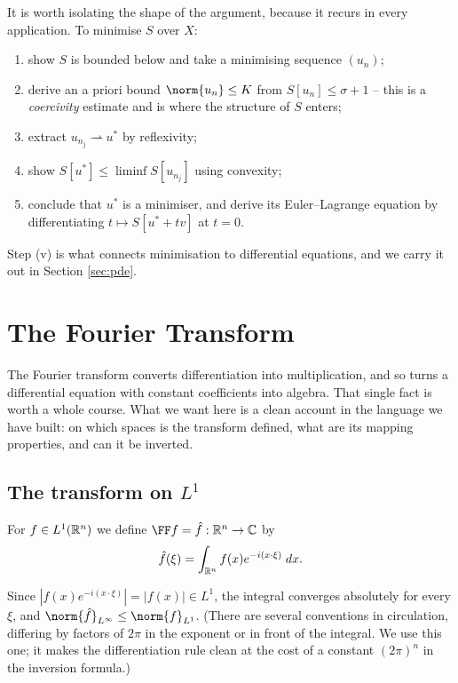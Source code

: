 \documentclass[a4paper]{scrartcl}
\newcommand{\weakto}{\rightharpoonup}
\begin{document}
\begin{remark}
	It is worth isolating the shape of the argument, because it recurs in every application. To minimise $S$ over $X$:
	\begin{enumerate}[label=(\roman*)]
		\item show $S$ is bounded below and take a minimising sequence $(u_n)$;
		\item derive an a priori bound $\norm{u_n}\le K$ from $S[u_n]\le \sigma + 1$ -- this is a \emph{coercivity} estimate and is where the structure of $S$ enters;
		\item extract $u_{n_j}\weakto u^*$ by reflexivity;
		\item show $S[u^*]\le\liminf S[u_{n_j}]$ using convexity;
		\item conclude that $u^*$ is a minimiser, and derive its Euler--Lagrange equation by differentiating $t \mapsto S[u^*+tv]$ at $t=0$.
	\end{enumerate}
	Step (v) is what connects minimisation to differential equations, and we carry it out in Section \ref{sec:pde}.
\end{remark}

\section{The Fourier Transform}\label{sec:fourier}

The Fourier transform converts differentiation into multiplication, and so turns a differential equation with constant coefficients into algebra. That single fact is worth a whole course. What we want here is a clean account in the language we have built: on which spaces is the transform defined, what are its mapping properties, and can it be inverted.

\subsection{The transform on \texorpdfstring{$L^1$}{L1}}

\begin{definition}
	For $f \in L^1(\mathbb{R}^n)$ we define $\FF f = \hat f : \R^n \to \C$ by
	$$\hat f (\xi) = \int_{\mathbb{R}^n} f(x) e^{-i (x\cdot\xi)}\; d x.$$
\end{definition}

Since $|f(x)e^{-i(x\cdot\xi)}| = |f(x)| \in L^1$, the integral converges absolutely for every $\xi$, and $\norm{\hat f}_{L^\infty}\le \norm{f}_{L^1}$. (There are several conventions in circulation, differing by factors of $2\pi$ in the exponent or in front of the integral. We use this one; it makes the differentiation rule clean at the cost of a constant $(2\pi)^n$ in the inversion formula.)
\end{document}
